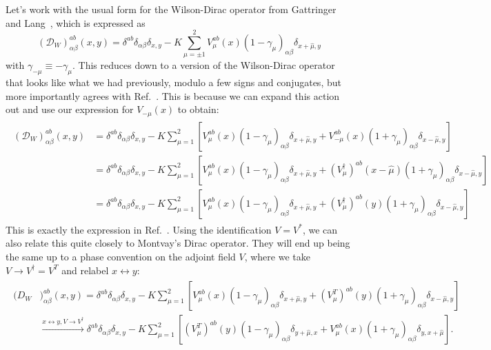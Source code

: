 Let's work with the usual form for the Wilson-Dirac operator from Gattringer and Lang~\cite{Gattringer:2010zz}, which is expressed as 
\begin{equation}
	(\mathcal D_W)_{\alpha\beta}^{ab}(x, y) = \delta^{ab} \delta_{\alpha\beta} \delta_{x, y} - K \sum_{\mu = \pm1}^2 V_\mu^{ab}(x) (1 - \gamma_\mu)_{\alpha\beta} \delta_{x + \hat\mu, y}
\end{equation}
with $\gamma_{-\mu}\equiv -\gamma_\mu$. This reduces down to a version of the Wilson-Dirac operator that looks like what we had previously, modulo a few signs and conjugates, but more importantly agrees with Ref.~\cite{Bergner:2022hoo}. This is because we can expand this action out and use our expression for $V_{-\mu}(x)$ to obtain:
\begin{align}\begin{split}
	(\mathcal D_W)_{\alpha\beta}^{ab}(x, y) &= \delta^{ab} \delta_{\alpha\beta} \delta_{x, y} - K \sum_{\mu = 1}^2 \left[ V_\mu^{ab}(x) (1 - \gamma_\mu)_{\alpha\beta} \delta_{x + \hat\mu, y} + V_{-\mu}^{ab}(x) (1 + \gamma_\mu)_{\alpha\beta} \delta_{x - \hat\mu, y} \right] \\
	&= \delta^{ab} \delta_{\alpha\beta} \delta_{x, y} - K \sum_{\mu = 1}^2 \left[ V_\mu^{ab}(x) (1 - \gamma_\mu)_{\alpha\beta} \delta_{x + \hat\mu, y} + (V_{\mu}^\dagger)^{ab}(x - \hat\mu) (1 + \gamma_\mu)_{\alpha\beta} \delta_{x - \hat\mu, y} \right] \\
	&= \delta^{ab} \delta_{\alpha\beta} \delta_{x, y} - K \sum_{\mu = 1}^2 \left[ V_\mu^{ab}(x) (1 - \gamma_\mu)_{\alpha\beta} \delta_{x + \hat\mu, y} + (V_{\mu}^\dagger)^{ab}(y) (1 + \gamma_\mu)_{\alpha\beta} \delta_{x - \hat\mu, y} \right]
\end{split}\end{align}
This is exactly the expression in Ref.~\cite{Bergner:2022hoo}. Using the identification $V = V^*$, we can also relate this quite closely to Montvay's Dirac operator. They will end up being the same up to a phase convention on the adjoint field $V$, where we take $V\rightarrow V^\dagger = V^T$ and relabel $x\leftrightarrow y$:
\begin{align}\begin{split}
	(D_W&)_{\alpha\beta}^{ab}(x, y) = \delta^{ab} \delta_{\alpha\beta} \delta_{x, y} - K \sum_{\mu = 1}^2 \left[ V_\mu^{ab}(x) (1 - \gamma_\mu)_{\alpha\beta} \delta_{x + \hat\mu, y} + (V_{\mu}^T)^{ab}(y) (1 + \gamma_\mu)_{\alpha\beta} \delta_{x - \hat\mu, y} \right] \\
	&\xrightarrow{x\leftrightarrow y, V\rightarrow V^\dagger} \delta^{ab} \delta_{\alpha\beta} \delta_{x, y} - K \sum_{\mu = 1}^2 \left[ (V_\mu^T)^{ab}(y) (1 - \gamma_\mu)_{\alpha\beta} \delta_{y + \hat\mu, x} + V_{\mu}^{ab}(x) (1 + \gamma_\mu)_{\alpha\beta} \delta_{y, x + \hat\mu} \right].
\end{split}\end{align}
